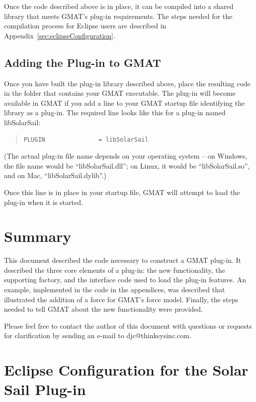 \documentclass[letterpaper,10pt]{article}
\begin{document}
Once the code described above is in place, it can be compiled into a shared library that meets
GMAT's plug-in requirements.  The steps needed for the compilation process for Eclipse users are
described in Appendix~\ref{sec:eclipseConfiguration}.

\subsection{Adding the Plug-in to GMAT}

Once you have built the plug-in library described above, place the resulting code in the folder
that contains your GMAT executable.  The plug-in will become available in GMAT if you add a line to
your GMAT startup file identifying the library as a plug-in.  The required line looks like this for
a plug-in named libSolarSail:

\begin{quote}
\begin{verbatim}
PLUGIN               = libSolarSail
\end{verbatim}
\end{quote}

\noindent (The actual plug-in file name depends on your operating system -- on Windows, the file
name would be ``libSolarSail.dll''; on Linux, it would be ``libSolarSail.so'', and on Mac,
``libSolarSail.dylib''.)

Once this line is in place in your startup file, GMAT will attempt to load the plug-in when it is
started.

\section{Summary}

This document described the code necessary to construct a GMAT plug-in.  It described the three
core elements of a plug-in: the new functionality, the supporting factory, and the interface code
used to load the plug-in features.  An example, implemented in the code in the appendices, was
described that illustrated the addition of a force for GMAT's force model.  Finally, the steps
needed to tell GMAT about the new functionality were provided.

Please feel free to contact the author of this document with questions or requests for
clarification by sending an e-mail to djc@thinksysinc.com.

\appendix

\section{\label{sec:eclipseConfiguration}Eclipse Configuration for the Solar Sail Plug-in}
\end{document}
